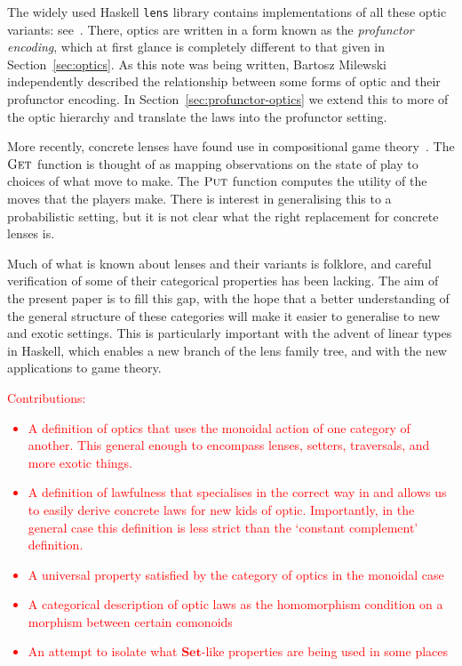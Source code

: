 \documentclass[11pt,letterpaper]{article}
\theoremstyle{plain}
\theoremstyle{definition}
\newcommand{\lenslib}{\texttt{lens}}
\newcommand{\Set}{\mathbf{Set}}
\newcommand{\fget}{\textsc{Get}}
\newcommand{\fput}{\textsc{Put}}
\newcommand{\todo}[1]{\textcolor{red}{\small #1}}
\begin{document}
The widely used Haskell \lenslib{} library contains implementations of all these optic variants: see~\cite{LensLibrary}. There, optics are written in a form known as the \emph{profunctor encoding}, which at first glance is completely different to that given in Section~\ref{sec:optics}. As this note was being written, Bartosz Milewski~\cite{ProfunctorOpticsPost} independently described the relationship between some forms of optic and their profunctor encoding. In Section~\ref{sec:profunctor-optics} we extend this to more of the optic hierarchy and translate the laws into the profunctor setting.

More recently, concrete lenses have found use in compositional game theory~\cite{CompositionalGameTheory}. The $\fget$ function is thought of as mapping observations on the state of play to choices of what move to make. The $\fput$ function computes the utility of the moves that the players make. There is interest in generalising this to a probabilistic setting, but it is not clear what the right replacement for concrete lenses is.

Much of what is known about lenses and their variants is folklore, and careful verification of some of their categorical properties has been lacking. The aim of the present paper is to fill this gap, with the hope that a better understanding of the general structure of these categories will make it easier to generalise to new and exotic settings. This is particularly important with the advent of linear types in Haskell, which enables a new branch of the lens family tree, and with the new applications to game theory.

\todo{Contributions:
  \begin{itemize}
  \item A definition of optics that uses the monoidal action of one category of another. This general enough to encompass lenses, setters, traversals, and more exotic things.
  \item A definition of lawfulness that specialises in the correct way in and allows us to easily derive concrete laws for new kids of optic. Importantly, in the general case this definition is less strict than the `constant complement' definition.
  \item A universal property satisfied by the category of optics in the monoidal case
  \item A categorical description of optic laws as the homomorphism condition on a morphism between certain comonoids
  \item An attempt to isolate what $\Set$-like properties are being used in some places
  \end{itemize}
}
\end{document}
